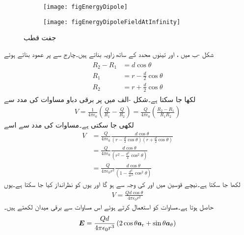 \begin{figure}
\centering
\begin{subfigure}{0.5\textwidth}
\centering
\texttt{[image: figEnergyDipole]}
\end{subfigure}%
%
\begin{subfigure}{0.5\textwidth}
\centering
\texttt{[image: figEnergyDipoleFieldAtInfinity]}
\end{subfigure}%
\caption{جفت قطب}
\label{شکل_توانائی_جفت_قطب}
\end{figure}

شکل -ب میں ،  اور   تینوں  محدد کے ساتھ  زاویہ بناتے ہیں۔چارج  سے  پر عمود بناتے ہوئے
\begin{gather}
\begin{aligned}\label{مساوات_توانائی_جفت_قطب_فاصلوں_میں_فرق}
R_2-R_1&=d \cos \theta \\
R_1 & =r-\frac{d}{2} \cos \theta\\
R_2 & =r+\frac{d}{2} \cos \theta
\end{aligned}
\end{gather}
لکھا جا سکتا ہے۔شکل -الف میں  پر برقی دباو  مساوات  کی مدد سے
\begin{align}\label{مساوات_توانائی_جفت_قطب_دباو_بنیادی_مساوات}
V=\frac{1}{4\pi \epsilon_0} \left(\frac{Q}{R_1}-\frac{Q}{R_2}\right)=\frac{Q}{4\pi \epsilon_0} \left(\frac{R_2-R_1}{R_1 R_2}\right)
\end{align}
لکھی جا سکتی ہے۔مساوات  کی مدد سے اسے
\begin{align*}
V&=\frac{Q}{4\pi \epsilon_0} \frac{d \cos \theta}{(r-\frac{d}{2} \cos \theta)(r+\frac{d}{2} \cos \theta)}\\
&=\frac{Q}{4\pi \epsilon_0} \frac{d \cos \theta}{(r^2-\frac{d^2}{4} \cos^2 \theta)}\\
&=\frac{Q}{4\pi \epsilon_0 r^2} \frac{d \cos \theta}{(1-\frac{d^2}{4 r^2} \cos^2 \theta)}
\end{align*}
لکھا جا سکتا ہے۔نیچے قوسین میں  اور  کی وجہ سے  ہو گا اور یوں  کو نظرانداز کیا جا سکتا ہے۔یوں
\begin{align}\label{مساوات_توانائی_جفت_قطب_دباو}
V=\frac{Qd \cos \theta}{4\pi \epsilon_0 r^2}
\end{align} 
حاصل ہوتا ہے۔مساوات  کو استعمال کرتے ہوئے اس مساوات سے برقی میدان لکھتے ہیں۔
\begin{align}\label{مساوات_توانائی_جفت_قطب_دور_میدان_الف}
{\ensuremath{{\boldsymbol{E}}}}=\frac{Q d}{4\pi \epsilon_0 r^3}\left(2 \cos \theta {\boldsymbol{a}}_{\textup{r}}+\sin \theta {\boldsymbol{a}}_{\theta} \right)
\end{align}


